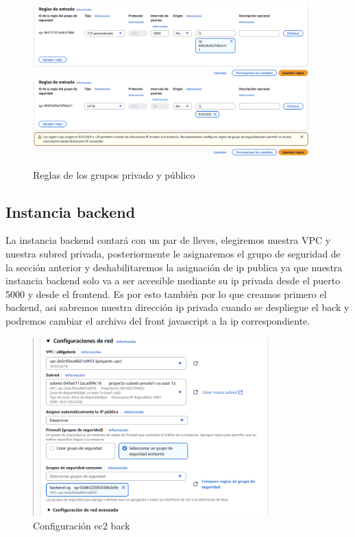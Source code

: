 \documentclass{article}
\begin{document}
		
	\begin{figure}[H]
	\centering
	\includegraphics[width=0.95\textwidth]{reglas_gr_privado.png}
	\includegraphics[width=0.95\textwidth]{reglas_gr_publico.png}
	\caption{Reglas de los grupos privado y público}
	\end{figure}

	\subsection{Instancia backend}
	La instancia backend contará con un par de lleves, elegiremos nuestra VPC y nuestra subred privada, posteriormente le asignaremos el grupo de seguridad de la sección anterior y deshabilitaremos la asignación de ip publica ya que nuestra instancia backend solo va a ser accesible mediante su ip privada desde el puerto 5000 y desde el frontend. Es por esto también por lo que creamos primero el backend, asi sabremos nuestra dirección ip privada cuando se despliegue el back y podremos cambiar el archivo del front javascript a la ip correspondiente.

			
	\begin{figure}[H]
	\centering
	\includegraphics[width=0.82\textwidth]{configuracion_ec2_back.png}
	\caption{Configuración ec2 back}
	\end{figure}
\end{document}
